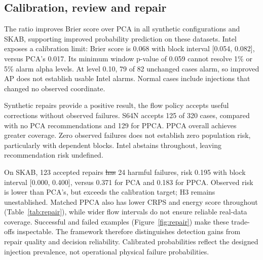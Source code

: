 \documentclass{llncs}
\newcommand{\1}{\mathbf{1}}
\providecommand{\DIFaddtex}[1]{{\protect\color{blue}\uwave{#1}}} %
\providecommand{\DIFdeltex}[1]{{\protect\color{red}\sout{#1}}}                      %
\providecommand{\DIFaddbegin}{} %
\providecommand{\DIFaddend}{} %
\providecommand{\DIFdelbegin}{} %
\providecommand{\DIFdelend}{} %
\providecommand{\DIFadd}[1]{\texorpdfstring{\DIFaddtex{#1}}{#1}} %
\providecommand{\DIFdel}[1]{\texorpdfstring{\DIFdeltex{#1}}{}} %
\begin{document}
\subsection{Calibration, review and repair}
The ratio improves Brier score over PCA in all synthetic configurations and SKAB, supporting improved probability prediction on these datasets. Intel exposes a calibration limit: Brier score is 0.068 with block interval [0.054, 0.082], versus PCA's 0.017. Its minimum window p-value of 0.059 cannot resolve 1\% or 5\% alarm alpha levels. At level 0.10, 79 of 82 unchanged cases alarm, so improved AP does not establish usable Intel alarms. Normal cases include injections that changed no observed coordinate.

Synthetic repairs provide a positive result, the flow policy accepts useful corrections without observed failures. S64N accepts 125 of 320 cases, compared with no PCA recommendations and 129 for PPCA. PPCA overall achieves greater coverage. Zero observed failures does not establish zero population risk, particularly with dependent blocks. Intel abstains throughout, leaving recommendation risk undefined.

On SKAB, 123 accepted repairs \DIFdelbegin \DIFdel{has }\DIFdelend \DIFaddbegin \DIFadd{have }\DIFaddend 24 harmful failures, risk 0.195 with block interval [0.000, 0.400], versus 0.371 for PCA and 0.183 for PPCA. Observed risk is lower than PCA's, but exceeds the calibration target; H3 remains unestablished. Matched PPCA also has lower CRPS and energy score throughout (Table~\ref{tab:repair}), while wider flow intervals do not ensure reliable real-data coverage. Successful and failed examples (Figure~\ref{fig:repair}) make these trade-offs inspectable. The framework therefore distinguishes detection gains from repair quality and decision reliability. Calibrated probabilities reflect the designed injection prevalence, not operational physical failure probabilities.
\end{document}
